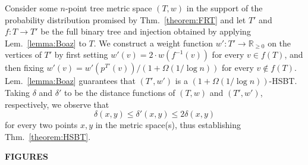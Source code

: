 \documentclass[11pt]{article}
\def\LongVersionEnd{}
\def\ShortVersion{}
\def\ShortVersionEnd{}
\theoremstyle{definition}
\theoremstyle{plain}
\theoremstyle{definition}
\theoremstyle{plain}
\theoremstyle{definition}
\theoremstyle{plain}
\newcommand{\Thm}{Thm.}
\newcommand{\Lem}{Lem.}
\newcommand{\Reals}{\mathbb{R}}
\begin{document}
Consider some $n$-point tree metric space $(T, w)$ in the support of the
probability distribution promised by \Thm{}~\ref{theorem:FRT} and let $T'$ and
$f : T \rightarrow T'$
be the full binary tree and injection obtained by applying
\Lem{}~\ref{lemma:Boaz} to $T$.
We construct a weight function
$w' : T' \rightarrow \Reals_{\geq 0}$
on the vertices of $T'$ by first setting
$w'(v) = 2 \cdot w(f^{-1}(v))$
for every
$v \in f(T)$,
and then fixing
$w'(v) = w'(p^{T'}(v)) / (1 + \Omega (1 / \log n))$
for every
$v \notin f(T)$.
\Lem{}~\ref{lemma:Boaz} guarantees that
$(T', w')$ is a $(1 + \Omega (1 / \log n))$-HSBT.
Taking $\delta$ and $\delta'$ to be the distance functions of $(T, w)$ and
$(T', w')$, respectively, we observe that
\[
\delta(x, y)
\leq
\delta'(x, y)
\leq
2 \delta(x, y)
\]
for every two points $x, y$ in the metric space(s), thus establishing
\Thm{}~\ref{theorem:HSBT}.

\LongVersionEnd %

\clearpage
\renewcommand{\thepage}{}

\ShortVersion %

\begin{center}
\textbf{\large{FIGURES}}
\end{center}

\PseudocodeStiltWalker{}

\FigureApp{}


\FigureSubphaseApp{}



\ShortVersionEnd %
\end{document}
